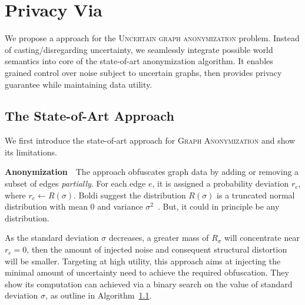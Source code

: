 \section{Privacy Via {\methodName}}

We propose a approach for the \textsc{Uncertain graph anonymization} problem. Instead of casting/disregarding uncertainty, we seamlessly integrate possible world semantics into core of the state-of-art anonymization algorithm. It enables grained control over noise subject to uncertain graphs, then provides privacy guarantee while maintaining data utility. 

\subsection{The State-of-Art Approach}
We first introduce the state-of-art approach for \textsc{Graph Anonymization} and show its limitations. 

\textbf{Anonymization}~~The approach obfuscates graph data by adding or removing a subset of edges \emph{partially}. For each edge $e$, it is assigned a probability deviation $r_{e}$, where $r_{e} \leftarrow R(\sigma)$. Boldi {\etal} suggest the distribution $R(\sigma)$ is a truncated normal distribution with mean 0 and variance $\sigma^2$~\cite{Boldi_Injecting_2012}. But, it could in principle be any distribution. 

As the standard deviation $\sigma$ decreases, a greater mass of $R_{\sigma}$ will concentrate near $r_{e}=0$, then the amount of injected noise and consequent structural distortion  will be smaller. Targeting at high utility, this approach aims at injecting the minimal amount of uncertainty need to achieve the required obfuscation. They show its computation can achieved via a binary search on the value of standard deviation $\sigma$, as outline in Algorithm~\ref{}. 




